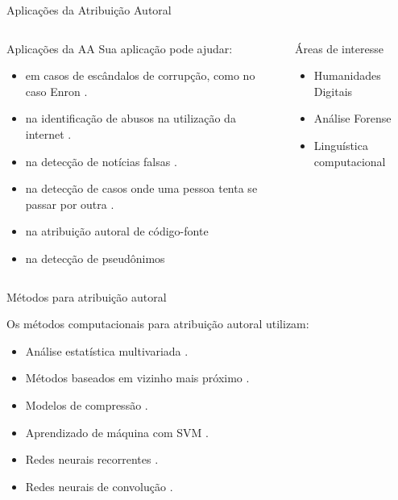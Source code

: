 \begin{frame}{Aplicações da Atribuição Autoral}

\begin{columns}
	\begin{column}{0.65\textwidth}
		\begin{block}{Aplicações da AA}
			Sua aplicação pode ajudar: 
			\begin{itemize}\itemsep9pt
				\item  em casos de escândalos de corrupção, como no caso Enron
				 \cite{corpusEnron,Chen2011}.
				\item na identificação de abusos na utilização da internet \cite{Gillam2012quite}.
				\item na detecção de notícias falsas \cite{Peng2016}.
				\item na detecção de casos onde uma pessoa tenta se passar por outra \cite{Koppel2018_pseud}.
				\item na atribuição autoral de código-fonte \cite{Alsulami2017}
				\item na detecção de pseudônimos \cite{Juola15}
				
			\end{itemize}
		\end{block}
	\end{column}
	\begin{column}{0.3\textwidth}
		\begin{block}{Áreas de interesse}
			\begin{itemize}
				\item Humanidades Digitais
				\item Análise Forense
				\item Linguística computacional
			\end{itemize}
		\end{block}
	\end{column}
\end{columns}

\end{frame}


\begin{frame}{Métodos para atribuição autoral}

Os métodos computacionais para atribuição autoral utilizam: 
\begin{itemize}
  \item Análise estatística multivariada \cite{Savoy2016,AA_delta2017}.
  \item Métodos baseados em vizinho mais próximo \cite{Kocher2017Verificacao,Koppel2018_pseud,Varela2016}.
  \item Modelos de compressão \cite{Halvani2018}.
  \item Aprendizado de máquina com SVM \cite{Schwartz2013,aa-distortion}.
  \item Redes neurais recorrentes \cite{Bagnall2016}.
  \item Redes neurais de convolução \cite{Shrestha2017,Sari2016}.
\end{itemize}

\end{frame}
